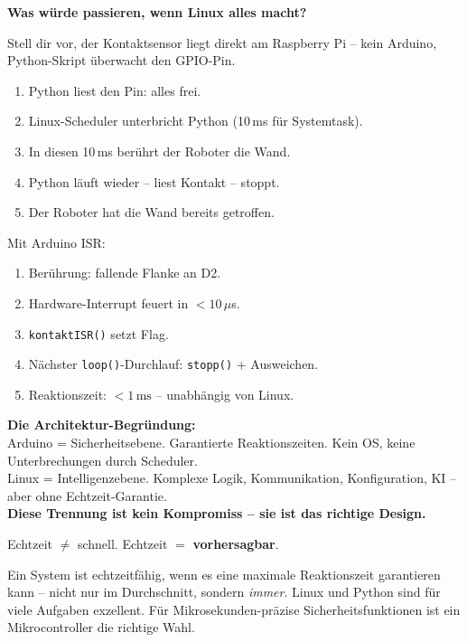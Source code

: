 \begin{loesungBox}
\textbf{Was würde passieren, wenn Linux alles macht?}

Stell dir vor, der Kontaktsensor liegt direkt am Raspberry Pi --
kein Arduino, Python-Skript überwacht den GPIO-Pin.

\begin{enumerate}
  \item Python liest den Pin: alles frei.
  \item Linux-Scheduler unterbricht Python (10\,ms für Systemtask).
  \item In diesen 10\,ms berührt der Roboter die Wand.
  \item Python läuft wieder -- liest Kontakt -- stoppt.
  \item Der Roboter hat die Wand bereits getroffen.
\end{enumerate}

Mit Arduino ISR:
\begin{enumerate}
  \item Berührung: fallende Flanke an D2.
  \item Hardware-Interrupt feuert in $< 10\,\mu$s.
  \item \texttt{kontaktISR()} setzt Flag.
  \item Nächster \texttt{loop()}-Durchlauf: \texttt{stopp()} + Ausweichen.
  \item Reaktionszeit: $< 1\,\text{ms}$ -- unabhängig von Linux.
\end{enumerate}
\end{loesungBox}

\begin{projektBox}
\textbf{Die Architektur-Begründung:}\\
Arduino = Sicherheitsebene. Garantierte Reaktionszeiten.
Kein OS, keine Unterbrechungen durch Scheduler.\\
Linux = Intelligenzebene. Komplexe Logik, Kommunikation,
Konfiguration, KI -- aber ohne Echtzeit-Garantie.\\
\textbf{Diese Trennung ist kein Kompromiss -- sie ist das
richtige Design.}
\end{projektBox}

\begin{merksatzBox}
Echtzeit \(\neq\) schnell. Echtzeit \(=\) \textbf{vorhersagbar}.

Ein System ist echtzeitfähig, wenn es eine maximale
Reaktionszeit garantieren kann -- nicht nur im Durchschnitt,
sondern \emph{immer}. Linux und Python sind für viele
Aufgaben exzellent. Für Mikrosekunden-präzise
Sicherheitsfunktionen ist ein Mikrocontroller die
richtige Wahl.
\end{merksatzBox}

